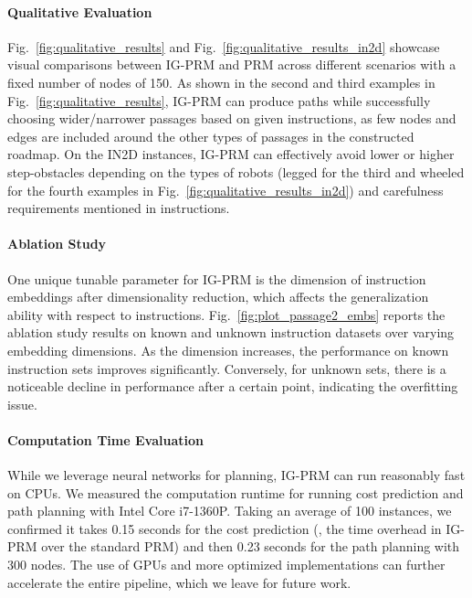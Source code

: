 \paragraph{Qualitative Evaluation}
Fig.~\ref{fig:qualitative_results} and Fig.~\ref{fig:qualitative_results_in2d} showcase visual comparisons between IG-PRM and PRM across different scenarios with a fixed number of nodes of 150. As shown in the second and third examples in Fig.~\ref{fig:qualitative_results}, IG-PRM can produce paths while successfully choosing wider/narrower passages based on given instructions, as few nodes and edges are included around the other types of passages in the constructed roadmap. On the IN2D instances, IG-PRM can effectively avoid lower or higher step-obstacles depending on the types of robots (legged for the third and wheeled for the fourth examples in Fig.~\ref{fig:qualitative_results_in2d}) and carefulness requirements mentioned in instructions.

\paragraph{Ablation Study}
One unique tunable parameter for IG-PRM is the dimension of instruction embeddings after dimensionality reduction, which affects the generalization ability with respect to instructions.
Fig.~\ref{fig:plot_passage2_embs} reports the ablation study results on known and unknown instruction datasets over varying embedding dimensions. As the dimension increases, the performance on known instruction sets improves significantly. Conversely, for unknown sets, there is a noticeable decline in performance after a certain point, indicating the overfitting issue. 

\paragraph{Computation Time Evaluation}
While we leverage neural networks for planning, IG-PRM can run reasonably fast on CPUs. We measured the computation runtime for running cost prediction and path planning with Intel\textregistered\xspace{} Core\texttrademark\xspace{} i7-1360P. Taking an average of 100 instances, we confirmed it takes 0.15 seconds for the cost prediction (\ie, the time overhead in IG-PRM over the standard PRM) and then 0.23 seconds for the path planning with 300 nodes. The use of GPUs and more optimized implementations can further accelerate the entire pipeline, which we leave for future work.

